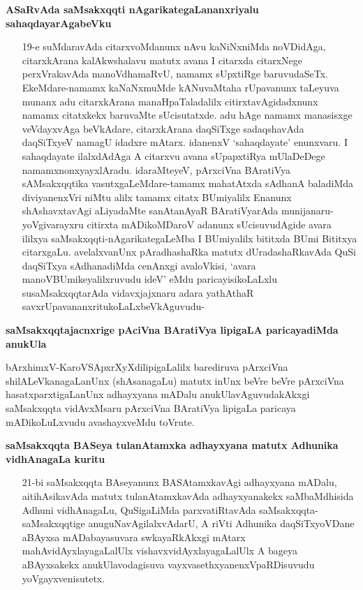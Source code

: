 \noindent
\textbf{ASaRvAda saMsakxqqti nAgarikategaLananxriyalu sahaqdayarAgabeVku}\label{page51}

\begin{itemize}
\item[19-e] suMdaravAda citarxvoMdanunx nAvu kaNiNxniMda noVDidAga, citarxkArana kalAkwshalavu matutx avana I citarxda citarxNege perxVrakavAda manoVdhamaRvU, namamx sUpxtiRge baruvudaSeTx. EkeMdare-namamx kaNaNxmuMde kANuvaMtaha rUpavanunx taLeyuva munanx adu citarxkArana manaHpaTaladalilx citirxtavAgidadxnunx namamx citatxkekx baruvaMte sUcisutatxde. adu hAge namamx manasisxge veVdayxvAga beVkAdare, citarxkArana daqSiTxge sadaqshavAda daqSiTxyeV namagU idadxre mAtarx. idanenxV `sahaqdayate' enunxvaru. I sahaqdayate ilalxdAdAga A citarxvu avana sUpapxtiRya mUlaDeDege namamxnonxyayxlAradu. idaraMteyeV, pArxciVna BAratiVya sAMsakxqqtika vasutxgaLeMdare-tamamx mahatAtxda sAdhanA baladiMda diviyanenxVri niMtu alilx tamamx citatx BUmiyalilx Enanunx shAshavxtavAgi aLiyadaMte sanAtanAyaR BAratiVyarAda munijanaru-yoVgivarayxru citirxta mADikoMDaroV adanunx sUcisuvudAgide avara ililxya saMsakxqqti-nAgarikategaLeMba I BUmiyalilx bititxda BUmi Bititxya citarxgaLu. avelalxvanUnx pAradhashaRka matutx dUradashaRkavAda QuSi daqSiTxya sAdhanadiMda cenAnxgi avaloVkisi, `avara manoVBUmikeyalilxruvudu ideV' eMdu paricayisikoLaLxlu susaMsakxqqtarAda vidavxjajxnaru adara yathAthaR savxrUpavananxritukoLaLxbeVkAguvudu-
\end{itemize}

\noindent
\textbf{saMsakxqqtajacnxrige pAciVna BAratiVya lipigaLA paricayadiMda anukUla}

bArxhimxV-KaroVSApxrXyXdilipigaLalilx barediruva pArxciVna shilALeVkanagaLanUnx (shAsanagaLu) matutx inUnx beVre beVre pArxciVna hasatxparxtigaLanUnx adhayxyana mADalu anukUlavAguvudakAkxgi saMsakxqqta vidAvxMsaru pArxciVna BAratiVya lipigaLa paricaya mADikoLuLxvudu avashayxveMdu toVrute.

\noindent
\textbf{saMsakxqqta BASeya tulanAtamxka adhayxyana matutx Adhunika vidhAnagaLa kuritu}\label{page52}

\begin{itemize}
\item[21-bi] saMsakxqqta BAseyanunx BASAtamxkavAgi adhayxyana mADalu, aitihAsikavAda matutx tulanAtamxkavAda adhayxyanakekx saMbaMdhisida Adhuni vidhAnagaLu, QuSigaLiMda parxvatiRtavAda saMsakxqqta-saMsakxqqtige anuguNavAgilalxvAdarU, A riVti Adhunika daqSiTxyoVDane aBAyxsa mADabayasuvara swkayaRkAkxgi mAtarx mahAvidAyxlayagaLalUlx vishavxvidAyxlayagaLalUlx A bageya aBAyxsakekx anukUlavodagisuva vayxvasethxyanenxVpaRDisuvudu yoVgayxvenisutetx.
\end{itemize}

